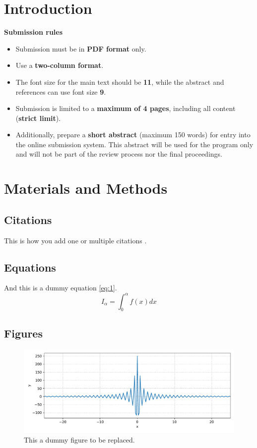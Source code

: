 \section{Introduction}

\textbf{\color{red}Submission rules}
\begin{itemize}
\color{red}
\item Submission must be in \textbf{PDF format} only.
\item Use a \textbf{two-column format}.
\item The font size for the main text should be \textbf{11}, while the abstract and references can use font size \textbf{9}.
\item Submission is limited to a \textbf{maximum of 4 pages}, including all content (\textbf{strict limit}).
\item Additionally, prepare a \textbf{short abstract} (maximum 150 words) for entry into the online submission system. This abstract will be used for the program only and will not be part of the review process nor the final proceedings.
\end{itemize}

\lipsum[2]

\section{Materials and Methods}
\subsection{Citations}
This is how you add one \cite{Liu2018} or multiple citations \cite{Baete2004,Vunckx2012,Burgos2014}.
\subsection{Equations}
And this is a dummy equation \ref{eq:1}.
\begin{equation}\label{eq:1}
I_\alpha = \int_0^\alpha f(x) dx
\end{equation}
\subsection{Figures}
\begin{figure}
  \centering
  \includegraphics[width=1.0\textwidth]{./fig1.pdf}
  \caption{This a dummy figure to be replaced.}
  \label{fig:dummyfigure}
\end{figure}

